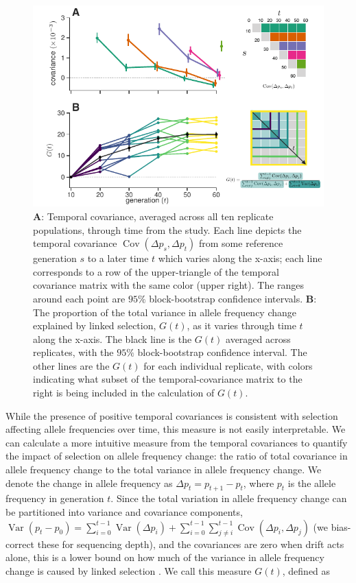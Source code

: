 \documentclass[11pt]{article}
\DeclareMathOperator{\var}{Var}
\DeclareMathOperator{\cov}{Cov}
\begin{document}
\begin{figure}[!htb]
  \centering
  \includegraphics[width=\textwidth]{figures/figure-1-revision.pdf}

  \caption{{\bf A}: Temporal covariance, averaged across all ten replicate
    populations, through time from the \textcite{Barghi2019-qy} study. Each
    line depicts the temporal covariance $\cov(\Delta p_s, \Delta p_t)$ from
    some reference generation $s$ to a later time $t$ which varies along the
    x-axis; each line corresponds to a row of the upper-triangle of the
    temporal covariance matrix with the same color (upper right). The ranges
    around each point are $95\%$ block-bootstrap confidence intervals. {\bf B}: The
    proportion of the total variance in allele frequency change explained by
    linked selection, $G(t)$, as it varies through time $t$ along the x-axis.
    The black line is the $G(t)$ averaged across replicates, with the $95\%$
    block-bootstrap confidence interval. The other lines are the $G(t)$ for
    each individual replicate, with colors indicating what subset of the
    temporal-covariance matrix to the right is being included in the
  calculation of $G(t)$.}

  \label{fig:figure-1}
\end{figure}

While the presence of positive temporal covariances is consistent with
selection affecting allele frequencies over time, this measure is not easily
interpretable. We can calculate a more intuitive measure from the temporal
covariances to quantify the impact of selection on allele frequency change: the
ratio of total covariance in allele frequency change to the total variance in
allele frequency change. We denote the change in allele frequency as $\Delta
p_t = p_{t+1}-p_t$, where $p_t$ is the allele frequency in generation $t$.
Since the total variation in allele frequency change can be partitioned into
variance and covariance components, $\var(p_t - p_0) = \sum_{i=0}^{t-1}
  \var(\Delta p_i) + \sum_{i=0}^{t-1} \sum_{j \ne i}^{t-1} \cov(\Delta p_i,
\Delta p_j)$ (we bias-correct these for sequencing depth), and the
covariances are zero when drift acts alone, this is a lower bound on how much
of the variance in allele frequency change is caused by linked selection
\parencite{Buffalo2019-io}. We call this measure $G(t)$, defined as
\end{document}
